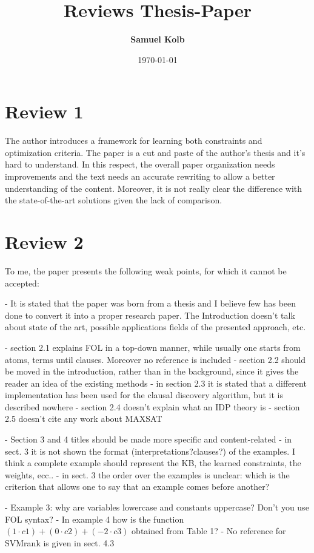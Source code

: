 \documentclass[a4paper]{article}
\title{Reviews Thesis-Paper}
\author{\textbf{Samuel Kolb}}
\date{\today}
\begin{document}
\maketitle

\section{Review 1}
The author introduces a framework for learning both constraints and optimization criteria.
The paper is a cut and paste of the author's thesis and it's hard to understand. 
In this respect, the overall paper organization needs improvements and the text needs an accurate rewriting to allow a better understanding of the content.
Moreover, it is not really clear the difference with the state-of-the-art solutions given the lack of comparison.

\section{Review 2}
To me, the paper presents the following weak points, for which it cannot be accepted:

- It is stated that the paper was born from a thesis and I believe few has been done to convert it
into a proper research paper. The Introduction doesn’t talk about state of the art, possible applications fields
of the presented approach, etc.

- section 2.1 explains FOL in a top-down manner, while usually one starts from atoms, terms until clauses. Moreover no reference is included
- section 2.2 should be moved in the introduction, rather than in the background, since it gives the reader
an idea of the existing methods
- in section 2.3 it is stated that a different implementation has been used for the clausal discovery algorithm, but
it is described nowhere
- section 2.4 doesn’t explain what an IDP theory is
- section 2.5 doesn’t cite any work about MAXSAT

- Section 3 and 4 titles should be made more specific and content-related
- in sect. 3 it is not shown the format (interpretations?clauses?) of the examples.
I think a complete example should represent the KB, the learned constraints, the weights, ecc..
- in sect. 3 the order over the examples is unclear: which is the criterion that allows one to say that an example
comes before another?

- Example 3: why are variables lowercase and constants uppercase? Don’t you use FOL syntax?
- In example 4 how is the function $(1 \cdot c1) + (0 \cdot c2) + (-2 \cdot c3)$ obtained from Table 1?
- No reference for SVMrank is given in sect. 4.3
\end{document}
